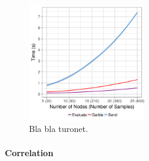 % 
% 
% 
% 


\begin{figure}
  \includegraphics[width=0.45\textwidth]{plots/turonet.png}
  \caption{Bla bla turonet.}
  \label{turonet-times}
\end{figure}

\paragraph{Correlation}

